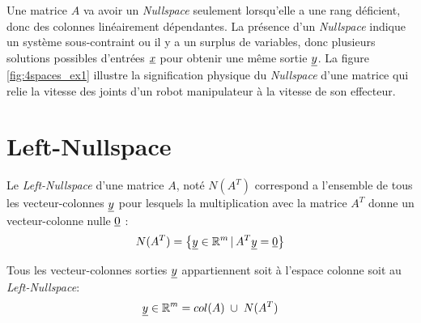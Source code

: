 Une matrice $A$ va avoir un \textit{Nullspace} seulement lorsqu'elle a une rang déficient, donc des colonnes linéairement dépendantes. La présence d'un \textit{Nullspace} indique un système sous-contraint ou il y a un surplus de variables, donc plusieurs solutions possibles d'entrées $\underline{x}$ pour obtenir une même sortie $\underline{y}$. 
%
%
La figure \ref{fig:4spaces_ex1} illustre la signification physique du \textit{Nullspace} d'une matrice qui relie la vitesse des joints d'un robot manipulateur à la vitesse de son effecteur. 

\section{Left-Nullspace}
\label{sec:leftnullspace}

Le \textit{Left-Nullspace} d'une matrice $A$, noté $N(A^T)$ correspond a l'ensemble de tous les vecteur-colonnes $\underline{y}$ pour lesquels la multiplication avec la matrice $A^T$ donne un vecteur-colonne nulle $\underline{0}$ :
\begin{align}
N(A^T) = \left\{ \underline{y} \in \mathbb{R}^m \,|\, A^T\underline{y} = \underline{0} \right\}
\end{align}

Tous les vecteur-colonnes sorties $\underline{y}$ appartiennent soit à l'espace colonne soit au \textit{Left-Nullspace}:
\begin{align}
\col{y} \in \re^m = col(A) \; \cup \; N(A^T) %
\end{align}

